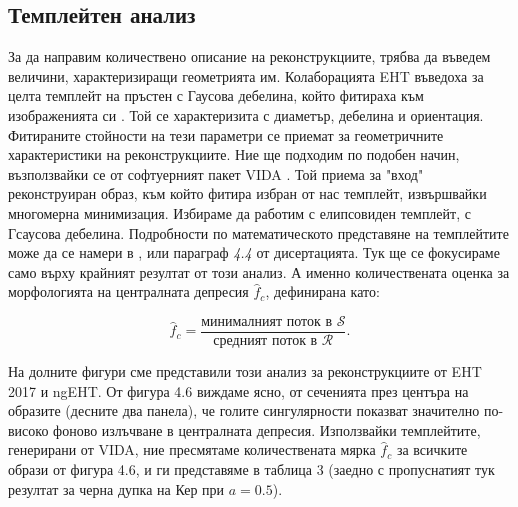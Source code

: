 \documentclass[12pt]{article}
\numberwithin{equation}{section}
\numberwithin{figure}{section}
\begin{document}
	
	\subsection{Темплейтен анализ}

	За да направим количествено описание на реконструкциите, трябва да въведем величини, характеризиращи геометрията им. Колаборацията EHT въведоха за целта темплейт на пръстен с Гаусова дебелина, който фитираха към изображенията си \cite{EHT_M87_VI}. Той се характеризита с диаметър, дебелина и ориентация. Фитираните стойности на тези параметри се приемат за геометричните характеристики на реконструкциите. Ние ще подходим по подобен начин, възползвайки се от софтуерният пакет VIDA \cite{VIDA}. Той приема за "вход"$\,$ реконструиран образ, към който фитира избран от нас темплейт, извършвайки многомерна минимизация. Избираме да работим с елипсовиден темплейт, с Гсаусова дебелина. Подробности по математическото представяне на темплейтите може да се намери в \cite{VIDA}, или параграф \emph{4.4} от дисертацията. Тук ще се фокусираме само върху крайният резултат от този анализ. А именно количествената оценка за морфологията на централната депресия $\hat{f}_c$, дефинирана като:
	
	\begin{equation}
		\hat{f}_c = \frac{\text{минималният поток в }\mathcal{S}}{\text{средният поток в }\mathcal{R}}.
	\end{equation}
	
	 \noindent На долните фигури сме представили този анализ за реконструкциите от EHT 2017 и ngEHT. От фигура 4.6 виждаме ясно, от сеченията през центъра на образите (десните два панела), че голите сингулярности показват значително по-високо фоново излъчване в централната депресия. Използвайки темплейтите, генерирани от VIDA, ние пресмятаме количествената мярка $\hat{f}_c$ за всичките образи от фигура 4.6, и ги представяме в таблица 3 (заедно с пропуснатият тук резултат за черна дупка на Кер при $a = 0.5$).
	 
\end{document}
